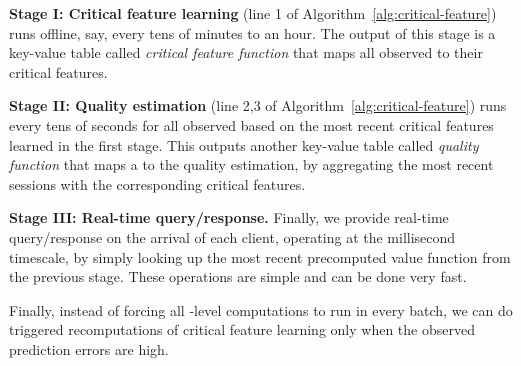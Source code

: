 \begin{packeditemize}

\item {\bf Stage I: Critical feature learning} 
(line 1 of Algorithm~\ref{alg:critical-feature}) runs offline, say, 
every tens of minutes to an hour.  The output of this stage is a 
key-value table called {\em critical feature function} that maps 
all observed  to their critical features.

\item {\bf Stage II: Quality estimation} 
(line 2,3 of Algorithm~\ref{alg:critical-feature}) runs every tens of seconds 
for all observed \leafs based on the most recent critical features 
learned in the first stage.  
This outputs another key-value table called {\em quality function}
that maps a \leaf to the quality estimation, by aggregating the most 
recent sessions with the corresponding critical features.


\item {\bf Stage III: Real-time query/response.} Finally, we 
provide real-time query/response on the arrival of each client,
operating  at the millisecond timescale, by simply looking up the 
most recent precomputed value function from the previous stage.  
These operations are simple and can be done very fast.

\end{packeditemize}
 
Finally, instead of forcing all \leaf-level computations to run in every 
batch, we can do triggered recomputations of critical feature learning 
only when the observed prediction errors are high.


